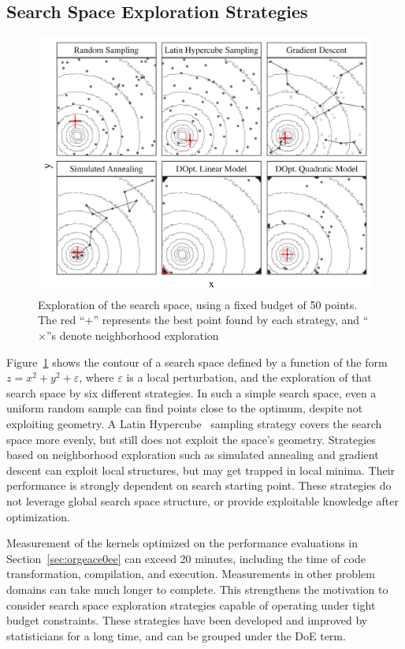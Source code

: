 \documentclass[conference]{IEEEtran}
\begin{document}
\subsection{Search Space Exploration Strategies}
\label{sec:org9d0e77e}
\begin{figure}[b]
\centering
\includegraphics[width=.95\columnwidth]{./img/sampling_comparison.pdf}
\caption{\label{fig:orgbae3568}
Exploration of the search space, using a fixed budget of 50 points. The red ``\(+\)'' represents the best point found by each strategy, and ``\(\times\)''s denote neighborhood exploration}
\end{figure}

Figure~\ref{fig:orgbae3568} shows the contour of  a search space defined by a
function of the form \(z  = x^2 + y^2 + \varepsilon\), where \(\varepsilon\)  is a local perturbation, and
the exploration  of that  search space  by six different  strategies. In  such a
simple search space, even  a uniform random sample can find  points close to the
optimum,      despite      not       exploiting      geometry.      A      Latin
Hypercube~\cite{carnell2018lhs} sampling  strategy covers the search  space more
evenly, but  still does not  exploit the  space's geometry. Strategies  based on
neighborhood exploration  such as simulated  annealing and gradient  descent can
exploit local structures, but may get trapped in local minima. Their performance
is strongly dependent on search starting point. These strategies do not leverage
global  search   space  structure,   or  provide  exploitable   knowledge  after
optimization.

Measurement  of  the  kernels  optimized   on  the  performance  evaluations  in
Section~\ref{sec:orgeace0ee} can exceed 20 minutes, including the time of code
transformation,  compilation,  and  execution.  Measurements  in  other  problem
domains can  take much longer  to complete.  This strengthens the  motivation to
consider search  space exploration strategies  capable of operating  under tight
budget  constraints.  These  strategies  have been  developed  and  improved  by
statisticians for a long time, and can be grouped under the DoE term.
\end{document}
